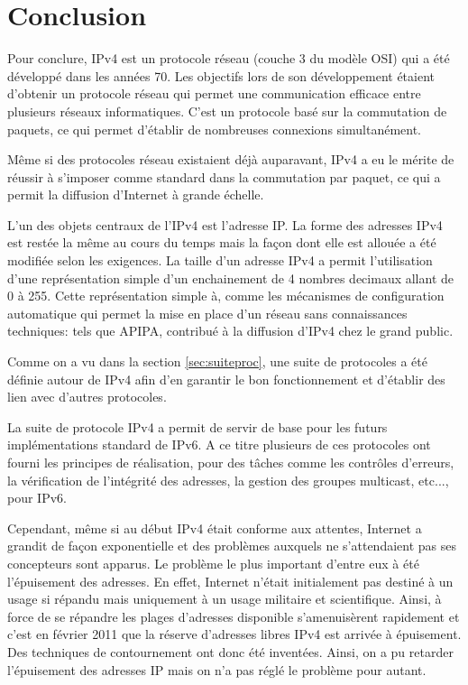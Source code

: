 \section{Conclusion}

Pour conclure, IPv4 est un protocole réseau (couche 3 du modèle OSI) qui a
été développé dans les années 70. Les objectifs lors de son développement
étaient d'obtenir un protocole réseau qui permet une communication efficace
entre plusieurs réseaux informatiques. C'est un protocole basé sur la
commutation de paquets, ce qui permet d'établir de nombreuses connexions
simultanément. 

\smallbreak
Même si des protocoles réseau existaient déjà auparavant, IPv4 a eu le mérite
de réussir à s'imposer comme standard dans la commutation par paquet, ce qui a
permit la diffusion d'Internet à grande échelle.

\smallbreak
L'un des objets centraux de l'IPv4 est l'adresse IP.  La forme des adresses
IPv4 est restée la même au cours du temps mais la façon dont elle est allouée a
été modifiée selon les exigences.  La taille d'un adresse IPv4 a permit
l'utilisation d'une représentation simple d'un enchainement de 4 nombres
decimaux allant de 0 à 255.  Cette représentation simple à, comme les
mécanismes de configuration automatique qui permet la mise en place d'un réseau
sans connaissances techniques: tels que APIPA, contribué à la diffusion
d'IPv4 chez le grand public.
\smallbreak

Comme on a vu dans la section \ref{sec:suiteproc}, une suite de protocoles a
été définie autour de IPv4 afin d'en garantir le bon fonctionnement et d'établir
des lien avec d'autres protocoles.

La suite de protocole IPv4 a permit de servir de base pour les futurs
implémentations standard de IPv6. A ce titre plusieurs de ces protocoles ont
fourni les principes de réalisation, pour des tâches comme les contrôles d'erreurs,
la vérification de l'intégrité des adresses, la gestion des groupes multicast,
etc..., pour IPv6.
\smallbreak


Cependant, même si au début IPv4 était conforme aux attentes, Internet a
grandit de façon exponentielle et des problèmes auxquels ne s'attendaient pas
ses concepteurs sont apparus.
Le problème le plus important d'entre eux à été l'épuisement des adresses. En
effet, Internet n'était initialement pas destiné à un usage si répandu mais
uniquement à un usage militaire et scientifique.  Ainsi, à force de se répandre
les plages d'adresses disponible s'amenuisèrent rapidement et c'est en février
2011 que la réserve d'adresses libres IPv4 est
arrivée à épuisement. Des techniques de contournement ont donc été inventées.
Ainsi, on a pu retarder l'épuisement des adresses IP mais on n'a pas réglé le
problème pour autant.

